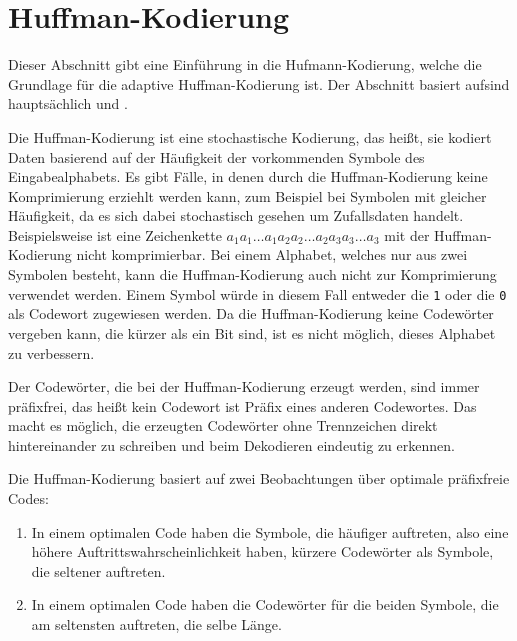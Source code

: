 \documentclass[twoside,11pt,a4paper]{article}
\theoremstyle{break}
\begin{document}

\section{Huffman-Kodierung}
Dieser Abschnitt gibt eine Einführung in die Hufmann-Kodierung, welche
die Grundlage für die adaptive Huffman-Kodierung ist. Der Abschnitt
basiert aufsind hauptsächlich \cite{Salomon:2010} und
\cite{Sayood:2006}.

Die Huffman-Kodierung ist eine stochastische Kodierung, das heißt, sie
kodiert Daten basierend auf der Häufigkeit der vorkommenden Symbole
des Eingabealphabets. Es gibt Fälle, in denen durch die
Huffman-Kodierung keine Komprimierung erziehlt werden kann, zum
Beispiel bei Symbolen mit gleicher Häufigkeit, da es sich dabei
stochastisch gesehen um Zufallsdaten handelt. Beispielsweise ist eine
Zeichenkette $a_1a_1{\dots}a_1a_2a_2{\dots}a_2a_3a_3{\dots}a_3$ mit
der Huffman-Kodierung nicht komprimierbar. Bei einem Alphabet, welches
nur aus zwei Symbolen besteht, kann die Huffman-Kodierung auch nicht
zur Komprimierung verwendet werden. Einem Symbol würde in diesem Fall
entweder die {\tt1} oder die {\tt0} als Codewort zugewiesen werden.
Da die Huffman-Kodierung keine Codewörter vergeben kann, die kürzer
als ein Bit sind, ist es nicht möglich, dieses Alphabet zu verbessern.

Der Codewörter, die bei der Huffman-Kodierung erzeugt werden, sind
immer präfixfrei, das heißt kein Codewort ist Präfix eines anderen
Codewortes. Das macht es möglich, die erzeugten Codewörter ohne
Trennzeichen direkt hintereinander zu schreiben und beim Dekodieren
eindeutig zu erkennen.

Die Huffman-Kodierung basiert auf zwei Beobachtungen über optimale
präfixfreie Codes:

\begin{enumerate}
\item In einem optimalen Code haben die Symbole, die häufiger
  auftreten, also eine höhere Auftrittswahrscheinlichkeit haben,
  kürzere Codewörter als Symbole, die seltener auftreten.
\item In einem optimalen Code haben die Codewörter für die beiden
  Symbole, die am seltensten auftreten, die selbe Länge.
\end{enumerate}
\end{document}
